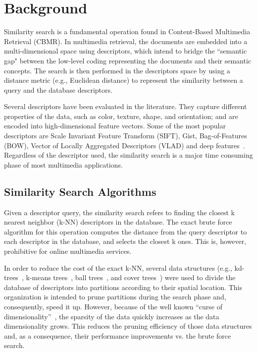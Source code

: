 \chapter{Background}
\label{sec:back}

Similarity search is a fundamental operation found in Content-Based Multimedia Retrieval (CBMR). In multimedia retrieval, the documents are embedded into a multi-dimensional space using descriptors, which intend to bridge the ``semantic gap" between the low-level coding  representing the documents and their semantic concepts. The search is then performed in the descriptors space by using a distance metric (e.g., Euclidean distance) to represent the similarity between a query and the database descriptors. 

Several descriptors have been evaluated in the literature. They capture different properties of the data, such as color, texture, shape, and orientation; and are encoded into high-dimensional feature vectors. Some of the most popular descriptors are Scale Invariant Feature Transform (SIFT), Gist, Bag-of-Features (BOW), Vector of Locally Aggregated Descriptors (VLAD) and deep features~\cite{Wan:2014:DLC:2647868.2654948,10.1007/978-3-319-10584-0_26,Douze:2009:EGD:1646396.1646421}. Regardless of the descriptor used, the similarity search is a major time consuming phase of most multimedia applications.

\section{Similarity Search Algorithms}

Given a descriptor query, the similarity search refers to finding the closest k nearest neighbor (k-NN) descriptors in the database. The exact brute force algorithm for this operation computes the distance from the query descriptor to each descriptor in the database, and selects the closest k ones. This is, however, prohibitive for online multimedia services. 

In order to reduce the cost of the exact k-NN, several data structures (e.g., kd-trees~\cite{Friedman1977209}, k-means trees~\cite{Muja2009331}, ball trees~\cite{UHLMANN1991175}, and cover trees~\cite{Beygelzimer:2006:CTN:1143844.1143857}) were used to divide the database of descriptors into partitions according to their spatial location. This organization is intended to prune partitions during the search phase and, consequently, speed it up. However, because of the well known  ``curse of dimensionality''~\cite{Bohm2001322,Weber:1998:QAP:645924.671192}, the sparsity of the data quickly increases as the data dimensionality grows. This reduces the pruning efficiency of those data structures and, as a consequence, their performance improvements vs. the brute force search.

